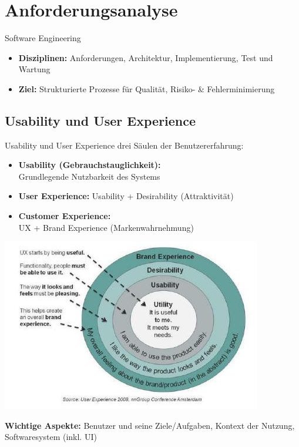 \section{Anforderungsanalyse}

\begin{definition}{Software Engineering}
\begin{itemize}
    \item \textbf{Disziplinen:} 
    Anforderungen, Architektur, Implementierung, Test und Wartung
    \item \textbf{Ziel:}  
    Strukturierte Prozesse für Qualität, Risiko- \& Fehlerminimierung
\end{itemize}
\end{definition} 

\subsection{Usability und User Experience}

\begin{concept}{Usability und User Experience} drei Säulen der Benutzererfahrung:
    \begin{itemize}
        \item \textbf{Usability (Gebrauchstauglichkeit):} \\ Grundlegende Nutzbarkeit des Systems
        \item \textbf{User Experience:} Usability + Desirability (Attraktivität)
        \item \textbf{Customer Experience:} \\ UX + Brand Experience (Markenwahrnehmung)
    \end{itemize}
    \includegraphics[width=0.6\linewidth]{images/2024_12_29_0d1d7b5551ea1b4b41bdg-02}
    
    \textbf{Wichtige Aspekte:}
    Benutzer und seine Ziele/Aufgaben, Kontext der Nutzung, Softwaresystem (inkl. UI)
\end{concept}

